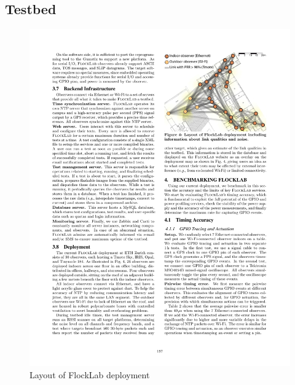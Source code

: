
\subsection{Testbed}

\begin{figure}
\centering
\includegraphics[trim=0cm 0cm 0cm 0cm, clip=true, totalheight=0.33\textheight]
{flocklabLayout.pdf}
\caption{Layout of FlockLab deployment}
\label{fig_flocklab}
\end{figure}

